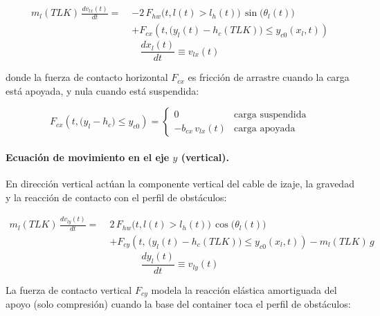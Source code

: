 \documentclass[12pt, a4paper]{article}
\begin{document}
\begin{equation}
    \label{eq:mov-carga-x}
\begin{split}
    m_l(TLK)\,\frac{dv_{lx}(t)}{dt} =\;
    &-2\,F_{hw}\!\bigl(t,l(t)>l_h(t)\bigr)\,\sin\!\bigl(\theta_l(t)\bigr) \\
    &+ F_{cx}\!\left(t,\bigl(y_l(t)-h_c(TLK)\bigr)\leq y_{c0}(x_l,t)\right)
\end{split}
\end{equation}
\begin{equation}
    \frac{dx_l(t)}{dt} \equiv v_{lx}(t)
\end{equation}

donde la fuerza de contacto horizontal $F_{cx}$ es fricción de arrastre cuando la
carga está apoyada, y nula cuando está suspendida:

\begin{equation}
    \label{eq:Fcx}
    F_{cx}\!\left(t,\bigl(y_l-h_c\bigr)\leq y_{c0}\right) =
    \begin{cases}
        0 & \text{carga suspendida} \\
        -b_{cx}\,v_{lx}(t) & \text{carga apoyada}
    \end{cases}
\end{equation}

\paragraph{Ecuación de movimiento en el eje $y$ (vertical).}

En dirección vertical actúan la componente vertical del cable de izaje, la gravedad y
la reacción de contacto con el perfil de obstáculos:

\begin{equation}
    \label{eq:mov-carga-y}
\begin{split}
    m_l(TLK)\,\frac{dv_{ly}(t)}{dt} =\;
    &2\,F_{hw}\!\bigl(t,l(t)>l_h(t)\bigr)\,\cos\!\bigl(\theta_l(t)\bigr) \\
    &+ F_{cy}\!\left(t,\,\bigl(y_l(t)-h_c(TLK)\bigr)\leq y_{c0}(x_l,t)\right)
    - m_l(TLK)\,g
\end{split}
\end{equation}
\begin{equation}
    \frac{dy_l(t)}{dt} \equiv v_{ly}(t)
\end{equation}

La fuerza de contacto vertical $F_{cy}$ modela la reacción elástica amortiguada del
apoyo (solo compresión) cuando la base del container toca el perfil de obstáculos:
\end{document}
